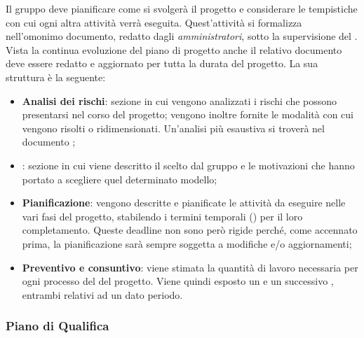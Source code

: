 Il gruppo deve pianificare come si svolgerà il progetto e considerare le tempistiche con cui ogni altra attività verrà 
eseguita. Quest'attività si formalizza nell'omonimo documento, redatto dagli \emph{amministratori}, sotto la 
supervisione del \emph{}. Vista la continua evoluzione del piano di progetto anche 
il relativo documento deve essere redatto e aggiornato per tutta la durata del progetto. La sua struttura è la seguente:
\begin{itemize}
    \item \textbf{Analisi dei rischi}: sezione in cui vengono analizzati i rischi che possono presentarsi nel corso del 
    progetto; vengono inoltre fornite le modalità con cui vengono risolti o ridimensionati. Un'analisi più esaustiva 
    si troverà nel documento ;
    \item \textbf{}: sezione in cui viene descritto il  
    scelto dal gruppo e le motivazioni che hanno portato a scegliere quel determinato modello;
    \item \textbf{Pianificazione}: vengono descritte e pianificate le attività da eseguire nelle vari fasi del progetto, 
    stabilendo i termini temporali () per il loro completamento. Queste deadline non sono però 
    rigide perché, come accennato prima, la pianificazione sarà sempre soggetta a modifiche e/o aggiornamenti;
    \item \textbf{Preventivo e consuntivo}: viene stimata la quantità di lavoro necessaria per ogni processo del 
     del progetto. Viene quindi esposto un  e un successivo 
    , entrambi relativi ad un dato periodo.
\end{itemize}

\subsubsection{Piano di Qualifica}

